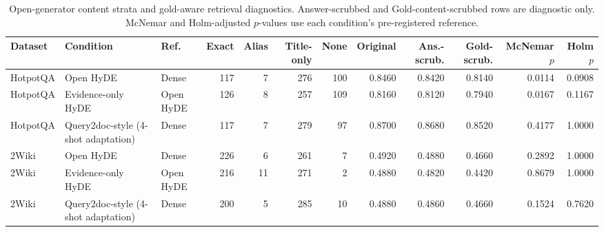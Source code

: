 \begin{table}[htbp]
\centering
\caption{Open-generator content strata and gold-aware retrieval diagnostics. Answer-scrubbed and Gold-content-scrubbed rows are diagnostic only. McNemar and Holm-adjusted $p$-values use each condition's pre-registered reference.}
\label{tab:open_generator_leakage}
\scriptsize
\setlength{\tabcolsep}{2.5pt}
\begin{tabular}{lllrrrrrrrrr}
\toprule
Dataset & Condition & Ref. & Exact & Alias & Title-only & None & Original & Ans.-scrub. & Gold-scrub. & McNemar $p$ & Holm $p$ \\
\midrule
HotpotQA & Open HyDE & Dense & 117 & 7 & 276 & 100 & 0.8460 & 0.8420 & 0.8140 & 0.0114 & 0.0908 \\
HotpotQA & Evidence-only HyDE & Open HyDE & 126 & 8 & 257 & 109 & 0.8160 & 0.8120 & 0.7940 & 0.0167 & 0.1167 \\
HotpotQA & Query2doc-style (4-shot adaptation) & Dense & 117 & 7 & 279 & 97 & 0.8700 & 0.8680 & 0.8520 & 0.4177 & 1.0000 \\
\midrule
2Wiki & Open HyDE & Dense & 226 & 6 & 261 & 7 & 0.4920 & 0.4880 & 0.4660 & 0.2892 & 1.0000 \\
2Wiki & Evidence-only HyDE & Open HyDE & 216 & 11 & 271 & 2 & 0.4880 & 0.4820 & 0.4420 & 0.8679 & 1.0000 \\
2Wiki & Query2doc-style (4-shot adaptation) & Dense & 200 & 5 & 285 & 10 & 0.4880 & 0.4860 & 0.4660 & 0.1524 & 0.7620 \\
\bottomrule
\end{tabular}
\end{table}
